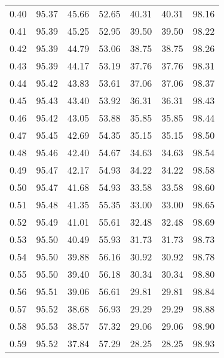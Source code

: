\begin{tabular}{|c|c|c|c|c|c|c|}
      0.40 &     95.37 &     45.66 &      52.65 &   40.31 &      40.31 &         98.16 \\
      0.41 &     95.39 &     45.25 &      52.95 &   39.50 &      39.50 &         98.22 \\
      0.42 &     95.39 &     44.79 &      53.06 &   38.75 &      38.75 &         98.26 \\
      0.43 &     95.39 &     44.17 &      53.19 &   37.76 &      37.76 &         98.31 \\
      0.44 &     95.42 &     43.83 &      53.61 &   37.06 &      37.06 &         98.37 \\
      0.45 &     95.43 &     43.40 &      53.92 &   36.31 &      36.31 &         98.43 \\
      0.46 &     95.42 &     43.05 &      53.88 &   35.85 &      35.85 &         98.44 \\
      0.47 &     95.45 &     42.69 &      54.35 &   35.15 &      35.15 &         98.50 \\
      0.48 &     95.46 &     42.40 &      54.67 &   34.63 &      34.63 &         98.54 \\
      0.49 &     95.47 &     42.17 &      54.93 &   34.22 &      34.22 &         98.58 \\
      0.50 &     95.47 &     41.68 &      54.93 &   33.58 &      33.58 &         98.60 \\
      0.51 &     95.48 &     41.35 &      55.35 &   33.00 &      33.00 &         98.65 \\
      0.52 &     95.49 &     41.01 &      55.61 &   32.48 &      32.48 &         98.69 \\
      0.53 &     95.50 &     40.49 &      55.93 &   31.73 &      31.73 &         98.73 \\
      0.54 &     95.50 &     39.88 &      56.16 &   30.92 &      30.92 &         98.78 \\
      0.55 &     95.50 &     39.40 &      56.18 &   30.34 &      30.34 &         98.80 \\
      0.56 &     95.51 &     39.06 &      56.61 &   29.81 &      29.81 &         98.84 \\
      0.57 &     95.52 &     38.68 &      56.93 &   29.29 &      29.29 &         98.88 \\
      0.58 &     95.53 &     38.57 &      57.32 &   29.06 &      29.06 &         98.90 \\
      0.59 &     95.52 &     37.84 &      57.29 &   28.25 &      28.25 &         98.93 \\

\end{tabular}
